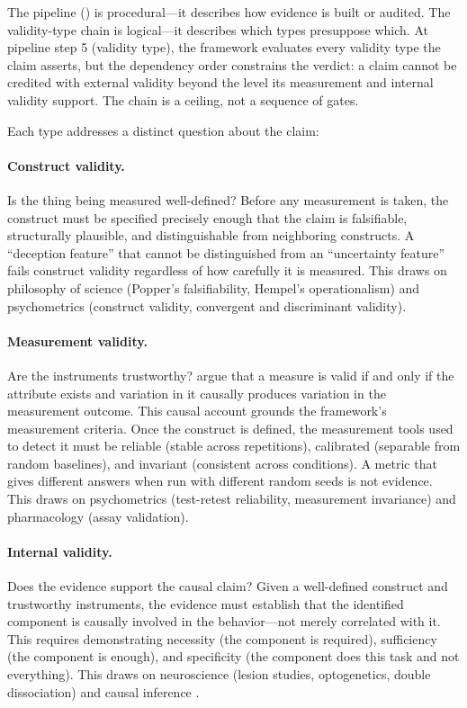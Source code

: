 \documentclass[10pt]{article}
\begin{document}
The pipeline () is procedural---it describes how evidence is built or audited. The validity-type chain is logical---it describes which types presuppose which. At pipeline step 5 (validity type), the framework evaluates every validity type the claim asserts, but the dependency order constrains the verdict: a claim cannot be credited with external validity beyond the level its measurement and internal validity support. The chain is a ceiling, not a sequence of gates.

Each type addresses a distinct question about the claim:

\paragraph{Construct validity.} Is the thing being measured well-defined? Before any measurement is taken, the construct must be specified precisely enough that the claim is falsifiable, structurally plausible, and distinguishable from neighboring constructs. A ``deception feature'' that cannot be distinguished from an ``uncertainty feature'' fails construct validity regardless of how carefully it is measured. This draws on philosophy of science (Popper's falsifiability, Hempel's operationalism) and psychometrics (construct validity, convergent and discriminant validity).

\paragraph{Measurement validity.} Are the instruments trustworthy? \citet{borsboom2004concept} argue that a measure is valid if and only if the attribute exists and variation in it causally produces variation in the measurement outcome. This causal account grounds the framework's measurement criteria. Once the construct is defined, the measurement tools used to detect it must be reliable (stable across repetitions), calibrated (separable from random baselines), and invariant (consistent across conditions). A metric that gives different answers when run with different random seeds is not evidence. This draws on psychometrics (test-retest reliability, measurement invariance) and pharmacology (assay validation).

\paragraph{Internal validity.} Does the evidence support the causal claim? Given a well-defined construct and trustworthy instruments, the evidence must establish that the identified component is causally involved in the behavior---not merely correlated with it. This requires demonstrating necessity (the component is required), sufficiency (the component is enough), and specificity (the component does this task and not everything). This draws on neuroscience (lesion studies, optogenetics, double dissociation) and causal inference \citep{pearl2009causality}.
\end{document}
